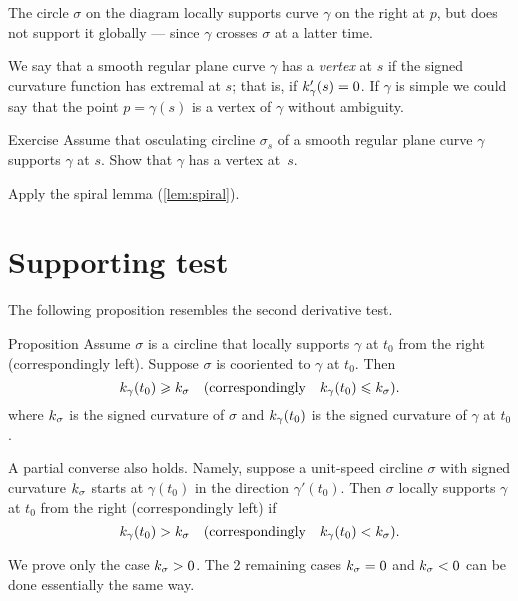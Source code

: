 The circle $\sigma$ on the diagram locally supports curve $\gamma$ on the right at $p$, but does not support it globally --- since $\gamma$ crosses $\sigma$ at a latter time.


We say that a smooth regular plane curve $\gamma$ has a \emph{vertex} at $s$
if the signed curvature function has extremal at $s$;
that is, if $k'_\gamma(s)=0$.
If $\gamma$ is simple we could say that the point $p=\gamma(s)$ is a vertex of $\gamma$ without ambiguity.

\begin{thm}{Exercise}\label{ex:vertex-support}
Assume that osculating circline $\sigma_s$ of a smooth regular plane curve $\gamma$ supports $\gamma$ at $s$.
Show that $\gamma$ has a vertex at~$s$.
\end{thm}

 Apply the spiral lemma (\ref{lem:spiral}).

\section*{Supporting test}

The following proposition resembles the second derivative test. 

\begin{thm}{Proposition}\label{prop:supporting-circline}
Assume $\sigma$ is a circline that locally supports $\gamma$ at $t_0$ from the right (correspondingly left). 
Suppose $\sigma$ is cooriented to $\gamma$ at $t_0$.
Then 
\[k_\gamma(t_0)\geqslant k_\sigma
\quad(\text{correspondingly}\quad k_\gamma(t_0)\leqslant k_\sigma).
\] 
where $k_\sigma$ is the signed curvature of $\sigma$ 
and $k_\gamma(t_0)$ is the signed curvature of $\gamma$ at $t_0$.

A partial converse also holds.
Namely, suppose a unit-speed circline $\sigma$ with signed curvature $k_\sigma$ starts at $\gamma(t_0)$ in the direction $\gamma'(t_0)$.
Then $\sigma$ locally supports $\gamma$ at $t_0$ from the right (correspondingly left) if 
\[k_\gamma(t_0)> k_\sigma
\quad(\text{correspondingly}\quad k_\gamma(t_0)< k_\sigma).
\]

\end{thm}


We prove only the case $k_\sigma>0$.
The 2 remaining cases $k_\sigma=0$ and $k_\sigma<0$ can be done essentially the same way.

